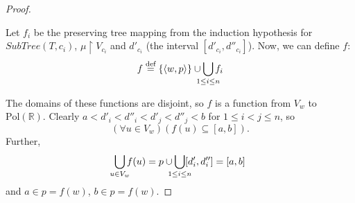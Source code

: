 \documentclass{article}
\newcommand{\R}{\mathbb{R}}
\newcommand{\Pol}{\text{Pol}}
\newcommand{\eqdef}{\stackrel{\text{def}}{=}}
\begin{document}
\begin{proof}
\begin{figure}[ht]
  \end{figure}

  Let $f_i$ be the preserving tree mapping from the induction hypothesis for $SubTree(T, c_i)$, $\mu \restriction V_{c_i}$ and $d'_{c_i}$ (the interval $[d'_{c_i}, d''_{c_i}]$). Now, we can define $f$:
  \begin{equation*}
    f \eqdef \{ \langle w, p \rangle \} \cup \bigcup_{\mathclap{1 \leq i \leq n}}f_i
  \end{equation*}

  The domains of these functions are disjoint, so $f$ is a function from $V_w$ to $\Pol(\R)$. Clearly $a < d'_i < d''_i < d'_j < d''_j < b$ for $1 \leq i < j \leq n$, so
  \begin{equation*}
    (\forall u \in V_w)(f(u) \subseteq [a, b]).
  \end{equation*}
  Further,
  \begin{equation*}
    \bigcup_{\mathclap{u \in V_w}}f(u) = p \cup \bigcup_{\mathclap{1 \leq i \leq n}} [d'_i, d''_{i}] = [a, b]
  \end{equation*}
  and $a \in p = f(w)$, $b \in p = f(w)$.


\end{proof}
\end{document}
